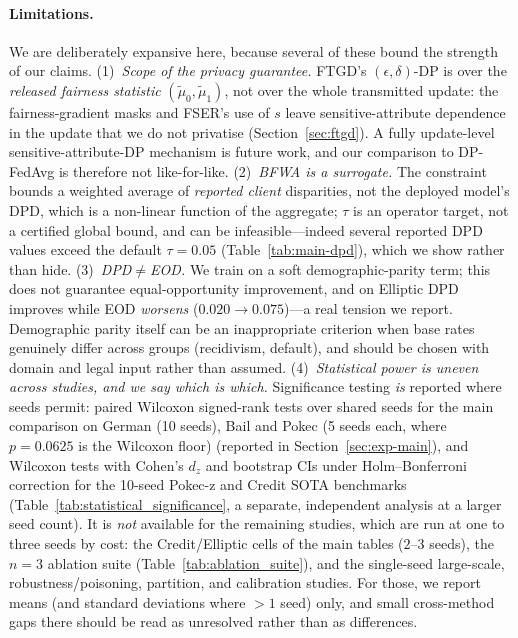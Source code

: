 \documentclass[pdflatex,sn-mathphys-num]{sn-jnl}
\theoremstyle{thmstyleone}%
\theoremstyle{thmstyletwo}%
\theoremstyle{thmstylethree}%
\begin{document}
\paragraph{Limitations.}
We are deliberately expansive here, because several of these bound the strength
of our claims. (1)~\emph{Scope of the privacy guarantee.} FTGD's
$(\epsilon,\delta)$-DP is over the \emph{released fairness statistic}
$(\tilde\mu_0,\tilde\mu_1)$, not over the whole transmitted update: the
fairness-gradient masks and FSER's use of $s$ leave sensitive-attribute
dependence in the update that we do not privatise (Section~\ref{sec:ftgd}). A
fully update-level sensitive-attribute-DP mechanism is future work, and our
comparison to DP-FedAvg is therefore not like-for-like. (2)~\emph{BFWA is a
surrogate.} The constraint bounds a weighted average of \emph{reported client}
disparities, not the deployed model's DPD, which is a non-linear function of the
aggregate; $\tau$ is an operator target, not a certified global bound, and can
be infeasible---indeed several reported DPD values exceed the default
$\tau{=}0.05$ (Table~\ref{tab:main-dpd}), which we show rather than hide.
(3)~\emph{DPD$\neq$EOD.} We train on a soft demographic-parity term; this does
not guarantee equal-opportunity improvement, and on Elliptic DPD improves while
EOD \emph{worsens} ($0.020\!\to\!0.075$)---a real tension we report. Demographic
parity itself can be an inappropriate criterion when base rates genuinely differ
across groups (recidivism, default), and should be chosen with domain and legal
input rather than assumed. (4)~\emph{Statistical power is uneven across studies, and we say which is which.}
Significance testing \emph{is} reported where seeds permit: paired Wilcoxon
signed-rank tests over shared seeds for the main comparison on German (10 seeds),
Bail and Pokec (5 seeds each, where $p{=}0.0625$ is the Wilcoxon floor)
(reported in Section~\ref{sec:exp-main}), and Wilcoxon tests with Cohen's $d_z$
and bootstrap CIs under Holm--Bonferroni correction for the 10-seed Pokec-z and
Credit SOTA benchmarks (Table~\ref{tab:statistical_significance}, a separate,
independent analysis at a larger seed count). It is
\emph{not} available for the remaining studies, which are run at one to three
seeds by cost: the Credit/Elliptic cells of the main tables ($2$--$3$ seeds), the
$n{=}3$ ablation suite (Table~\ref{tab:ablation_suite}), and the single-seed
large-scale, robustness/poisoning, partition, and calibration studies. For those,
we report means (and standard deviations where $>1$ seed) only, and small
cross-method gaps there should be read as unresolved rather than as differences.
\end{document}

